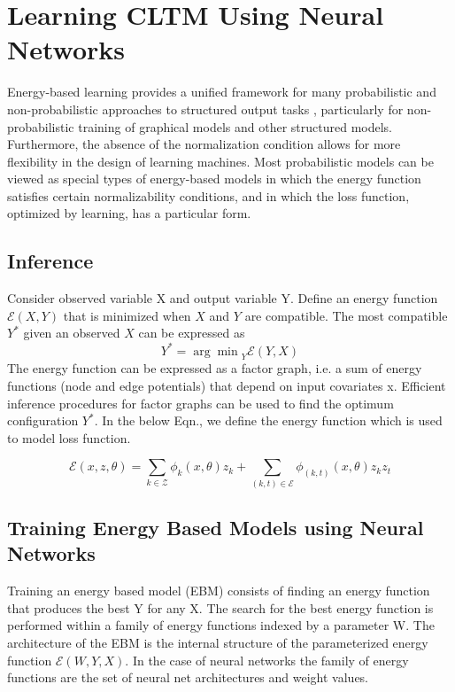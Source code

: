 \documentclass{article}
\begin{document}
\section{ Learning CLTM Using Neural Networks}\label{sec:4}
Energy-based learning provides a unified framework for many probabilistic and non-probabilistic approaches to structured output tasks \cite{lossfunctions}, particularly for non-probabilistic training of graphical models and other structured models. Furthermore, the absence of the normalization condition allows for more flexibility in the design of learning machines. Most probabilistic models can be viewed as special types of energy-based models in which the energy function satisfies certain normalizability conditions, and in which the loss function, optimized by learning, has a particular form.
\subsection{Inference}

Consider observed variable X and output variable Y.
Define an energy function  $\mathcal{E}(X,Y)$ that is minimized  when $X$ and $Y$ are compatible. The most compatible $Y^{*}$ given an observed $X$ can be expressed as
\begin{equation*}{ Y }^{ * }={\arg\min}_{ Y } \mathcal{E}(Y,X)
\end{equation*}
The energy function can be expressed as a factor graph, i.e. a sum of energy functions (node and edge potentials) that depend on input covariates x. Efficient inference procedures for factor graphs can be used to find the optimum configuration $Y^{*}$. In the below Eqn., we define the energy function which is used to model loss function.

 \begin{equation*}
 \mathcal{E}(x,z,\theta)= \sum_{k \in \mathcal{Z}}\phi_{k}(x, \theta)z_{k} + \sum_{(k,t) \in \mathcal{E}}\phi_{(k,t)}(x,\theta)z_{k}z_{t}
\end{equation*}

\subsection{Training Energy Based Models using Neural Networks}
Training an energy based model (EBM) consists of finding an energy function that produces the best Y for any X. The search for the best energy function is performed within a family of energy functions indexed by a parameter W. The architecture of the EBM is the internal structure of the parameterized energy function $\mathcal{E}(W,Y,X)$. In the case of neural networks the family of energy functions are the set of neural net architectures and weight values.
\end{document}
